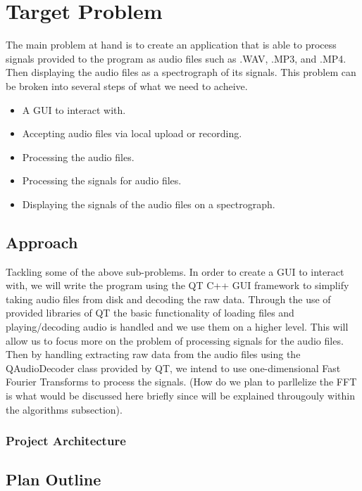 \documentclass[journal]{IEEEtran}
\begin{document}
\section{Target Problem}
	\par {The main problem at hand is to create an application that is able to process signals 
	provided to the program as audio files such as .WAV, .MP3, and .MP4. Then displaying the audio 
	files as a spectrograph of its signals. This problem can be broken into several steps of 
	what we need to acheive.}

\begin{itemize}
	\item A GUI to interact with.
	\item Accepting audio files via local upload or recording.
	\item Processing the audio files.
	\item Processing the signals for audio files.
	\item Displaying the signals of the audio files on a spectrograph.
\end{itemize}

\subsection{Approach}
	\par {Tackling some of the above sub-problems. In order to create a GUI to interact with, 
	we will write the program using the QT C++ GUI framework to simplify taking audio files 
	from disk and decoding the raw data. Through the use of provided libraries of QT the 
	basic functionality of loading files and playing/decoding audio is handled and we use 
	them on a higher level. This will allow us to focus more on the problem of processing 
	signals for the audio files. Then by handling extracting raw data from the audio files 
	using the QAudioDecoder class provided by QT, we intend to use one-dimensional Fast 
	Fourier Transforms to process the signals. (How do we plan to parllelize the FFT is 
	what would be discussed here briefly since will be explained througouly within 
	the algorithms subsection).}
\subsubsection{Project Architecture}


\subsection{Plan Outline}
\end{document}
